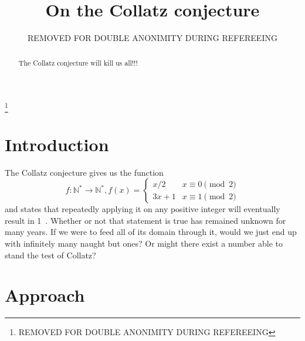 \documentclass{proc-l}
\theoremstyle{definition}
\theoremstyle{remark}
\numberwithin{equation}{section}
\begin{document}
\title{On the Collatz conjecture}


\author{REMOVED FOR DOUBLE ANONIMITY DURING REFEREEING}
\address{REMOVED FOR DOUBLE ANONIMITY DURING REFEREEING}
\thanks{REMOVED FOR DOUBLE ANONIMITY DURING REFEREEING}






\begin{abstract}
The Collatz conjecture will kill us all!!!
\end{abstract}

\maketitle


\section{Introduction}

The Collatz conjecture gives us the function 
\[f : \mathbb{N}^{*} \rightarrow \mathbb{N}^{*}, f(x) = 
\begin{cases}
	x / 2 & x\equiv 0 \pmod 2\\
	3x + 1 & x\equiv 1 \pmod 2
\end{cases}\] and states that repeatedly applying it on any positive integer will eventually result in 1~\cite{Lagarias}. Whether or not that statement is true has remained unknown for many years. If we were to feed all of its domain through it, would we just end up with infinitely many naught but ones? Or might there exist a number able to stand the test of Collatz?

\section{Approach}
\end{document}
